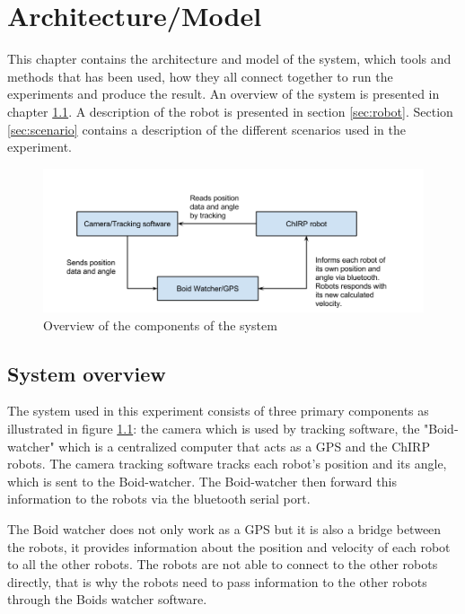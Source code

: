 \chapter{Architecture/Model}
\label{cha:architectureAndModel}
This chapter contains the architecture and model of the system, which tools and methods that has been used, how they all connect together to run the experiments and produce the result.
An overview of the system is presented in chapter \ref{sec:overview}. A description of the robot is presented in section \ref{sec:robot}. Section \ref{sec:scenario} contains a description of the different scenarios used in the experiment.

\begin{figure}[h]
\begin{center}
\includegraphics[width=\linewidth]{figs/system_overview}
\end{center}
\caption[System overview]{Overview of the components of the system}
\label{fig:overview}
\end{figure}

\section{System overview}
\label{sec:overview}

The system used in this experiment consists of three primary components as illustrated in figure \ref{fig:overview}: the camera which is used by tracking software, the "Boid-watcher" which is a centralized computer that acts as a GPS and the ChIRP robots.
The camera tracking software tracks each robot's position and its angle, which is sent to the Boid-watcher. The Boid-watcher then forward this information to the robots via the bluetooth serial port.

The Boid watcher does not only work as a GPS but it is also a bridge between the robots, it provides information about the position and velocity of each robot to all the other robots. The robots are not able to connect to the other robots directly, that is why the robots need to pass information to the other robots through the Boids watcher software.

